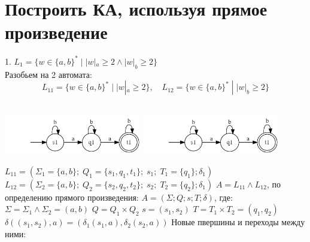 \documentclass{article}
\begin{document}
\section{Построить КА, используя прямое произведение}

    1. $L_1 = \{w \in \{a, b\}^* \; | \; |w|_a \geq 2 \wedge |w|_b \geq 2\}$\\
    Разобьем на 2 автомата:
    $$L_{11} = \{w \in \{a, b\}^* \; | \; |w|_a \geq 2\}, \quad L_{12} = \{w \in \{a, b\}^* \; | \; |w|_b \geq 2\}$$\\
    \begin{center}
        \includegraphics[width=0.45\textwidth]{task2/pic2.1.1}
        \includegraphics[width=0.45\textwidth]{task2/pic2.1.1}
    \end{center}
    $L_{11}=(\Sigma_1 = \{a, b\};\; Q_1 = \{s_1, q_1, t_1\};\; s_1;\; T_1 = \{q_1\}; \delta_1)$ \newline
    $L_{12}=(\Sigma_2 = \{a, b\};\; Q_2 = \{s_2, q_2, t_2\};\; s_2;\; T_2 = \{q_2\};
    \delta_1)$ \newline
    $A = L_{11} \land L_{12}$, по определению прямого произведения: \newline\newline
    $A = (\Sigma; Q; s; T; \delta)$, где: \newline
    $\Sigma = \Sigma_1 \land \Sigma_2 = (a, b)$ \newline
    $Q = Q_1 \times Q_2$ \newline
    $s = (s_1, s_2)$ \newline
    $T = T_1 \times T_2 = (q_1, q_2)$ \newline
    $\delta((s_1, s_2), a) = (\delta_1(s_1, a), \delta_2(s_2, a))$ \newline\newline
    Новые пвершины и переходы между ними:
\end{document}
